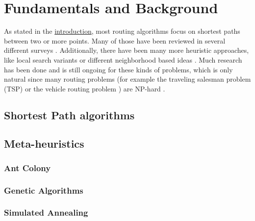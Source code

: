 \chapter{Fundamentals and Background}
\label{chapter:fundamentals}

As stated in the \href{chapter:introduction}{introduction}, most routing algorithms focus on shortest paths between two or more points.
Many of those have been reviewed in several different surveys \cite{madkourSurveyShortestPathAlgorithms2017, sommerShortestpathQueriesStatic2014, wayahdiGreedyAStarDijkstra2021}.
Additionally, there have been many more heuristic approaches, like local search variants \cite{braysyVehicleRoutingProblem2005, irnichSequentialSearchIts2006, ropkeHeuristicExactAlgorithms2005} or different neighborhood based ideas \cite{braysyVehicleRoutingProblem2005, irnichSequentialSearchIts2006, ropkeHeuristicExactAlgorithms2005}.
Much research has been done and is still ongoing for these kinds of problems, which is only natural since many routing problems (for example the traveling salesman problem (TSP) \cite{gendreauHandbookMetaheuristics2010} or the vehicle routing problem \cite{braysyVehicleRoutingProblem2005, irnichSequentialSearchIts2006}) are NP-hard \cite{reineltTravelingSalesmanComputational2003}.

\section{Shortest Path algorithms}
\label{sec:shortestPath}


\section{Meta-heuristics}
\label{sec:metaHeuristics}

\subsection{Ant Colony}
\label{subsec:antColonyBackground}

\subsection{Genetic Algorithms}
\label{subsec:geneticAlgorithmsBackground}

\subsection{Simulated Annealing}
\label{subsec:simulatedAnnealingBackground}